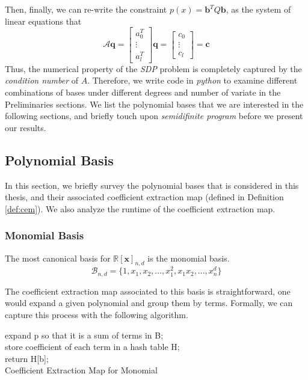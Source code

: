\documentclass[12pt]{amsart}
\numberwithin{equation}{section}
\theoremstyle{definition}
\numberwithin{thm}{section}
\begin{document}
\smallskip
Then, finally, we can re-write the constraint $p(x) = \mathbf{b}^T Q \mathbf{b}$, as the system of linear equations that 
\begin{equation*}
     \mathcal{A} \mathbf{q} = \begin{bmatrix}
          a_0^T \\
          \vdots \\
          a_l^T
     \end{bmatrix} \mathbf{q} = \begin{bmatrix}
          c_0 \\
          \vdots \\
          c_l
     \end{bmatrix} = \mathbf{c}
\end{equation*}
Thus, the numerical property of the \emph{SDP} problem is completely captured by the \emph{condition number} of $A$. 
Therefore, we write code in \emph{python} to examine different combinations of bases under different degrees and number of variate in the Preliminaries sections. 
We list the polynomial bases that we are interested in the following sections, and briefly touch upon \emph{semidifinite program} before we present our results.

\subsection{Polynomial Basis}
\label{Sec:polynomial Basis}
In this section, we briefly survey the polynomial bases that is considered in this thesis,
and their associated {coefficient extraction map} (defined in Definition \ref{def:cem}).
We also analyze the runtime of the {coefficient extraction map}.

\subsubsection{Monomial Basis}
The most canonical basis for $\mathbb{R}[\mathbf{x}]_{n, d}$ is the monomial basis. 
\begin{equation*}
     \mathcal{B}_{n, d} = \{1, x_1, x_2, ..., x_1^2, x_1 x_2, ..., x_n^d\}
\end{equation*}

The {coefficient extraction map} associated to this basis is straightforward, 
one would expand a given polynomial and group them by terms. Formally, we can capture this process with the following algorithm.

\begin{algorithm}[H]
     \SetAlgoLined
     expand p so that it is a sum of terms in B;\\
     store coefficient of each term in a hash table H;\\
     return H[b];\\
     \caption{Coefficient Extraction Map for Monomial}
\end{algorithm}
\end{document}
